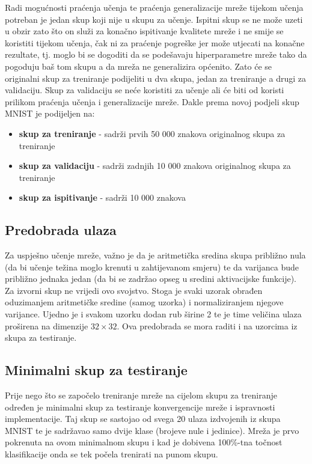 \documentclass[times, utf8, zavrsni, numeric]{fer}
\begin{document}
Radi mogućnosti praćenja učenja te praćenja generalizacije mreže tijekom učenja potreban je jedan skup koji nije u skupu za učenje. Ispitni skup se ne može uzeti u obzir zato što on služi za konačno ispitivanje kvalitete mreže i ne smije se koristiti tijekom učenja, čak ni za praćenje pogreške jer može utjecati na konačne rezultate, tj. moglo bi se dogoditi da se podešavaju hiperparametre mreže tako da pogoduju baš tom skupu a da mreža ne generalizira općenito. Zato će se originalni skup za treniranje podijeliti u dva skupa, jedan za treniranje a drugi za validaciju. Skup za validaciju se neće koristiti za učenje ali će biti od koristi prilikom praćenja učenja i generalizacije mreže. Dakle prema novoj podjeli skup MNIST je podijeljen na:
\begin{itemize}
\item \textbf{skup za treniranje} - sadrži prvih 50 000 znakova originalnog skupa za treniranje
\item \textbf{skup za validaciju} - sadrži zadnjih 10 000 znakova originalnog skupa za treniranje
\item \textbf{skup za ispitivanje} - sadrži 10 000 znakova
\end{itemize}

\subsection{Predobrada ulaza}
Za uspješno učenje mreže, važno je da je aritmetička sredina skupa približno nula (da
bi učenje težina moglo krenuti u zahtijevanom smjeru) te da varijanca bude
približno jednaka jedan (da bi se zadržao opseg u sredini aktivacijske funkcije).
Za izvorni skup ne vrijedi ovo svojstvo. Stoga je svaki uzorak obrađen oduzimanjem 
aritmetičke sredine (samog uzorka) i normaliziranjem njegove varijance. Ujedno je i svakom uzorku dodan rub širine 2 te je time veličina ulaza proširena na dimenzije $32 \times 32$. Ova predobrada se mora raditi i na uzorcima iz skupa za testiranje.

\subsection{Minimalni skup za testiranje}
Prije nego što se započelo treniranje mreže na cijelom skupu za treniranje određen je minimalni skup za testiranje konvergencije mreže i ispravnosti implementacije. Taj skup se sastojao od svega 20 ulaza izdvojenih iz skupa MNIST te je sadržavao samo dvije klase (brojeve nule i jedinice). Mreža je prvo pokrenuta na ovom minimalnom skupu i kad je dobivena 100\%-tna točnost klasifikacije onda se tek počela trenirati na punom skupu.
\end{document}
